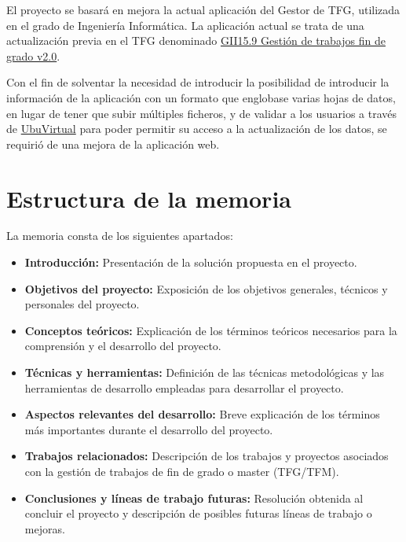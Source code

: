 El proyecto se basará en mejora la actual aplicación del Gestor de TFG, utilizada en el grado de Ingeniería Informática. La aplicación actual se trata de una actualización previa en el TFG denominado \href{https://github.com/jfb0019/Gestor-TFG-2016}{GII15.9 Gestión de trabajos fin de grado v2.0}. 

Con el fin de solventar la necesidad de introducir la posibilidad de introducir la información de la aplicación con un formato que englobase varias hojas de datos, en lugar de tener que subir múltiples ficheros, y de validar a los usuarios a través de \href{https://ubuvirtual.ubu.es/}{UbuVirtual} para poder permitir su acceso a la actualización de los datos, se requirió de una mejora de la aplicación web.

\section{Estructura de la memoria}
La memoria consta de los siguientes apartados:

\begin{itemize}
	\item \textbf{Introducción:} Presentación de la solución propuesta en el proyecto. 
	\item \textbf{Objetivos del proyecto:}  Exposición de los  objetivos generales, técnicos y personales del proyecto.
	\item \textbf{Conceptos teóricos:} Explicación de los términos teóricos necesarios para la comprensión y el desarrollo del proyecto.
	\item \textbf{Técnicas y herramientas:} Definición de las técnicas metodológicas y las herramientas de desarrollo empleadas para desarrollar el proyecto.
	\item \textbf{Aspectos relevantes del desarrollo:} Breve explicación de los términos más importantes durante el desarrollo del proyecto.
	\item \textbf{Trabajos relacionados:} Descripción de los trabajos y proyectos asociados con la gestión de trabajos de fin de grado o master (TFG/TFM).
	\item \textbf{Conclusiones y líneas de trabajo futuras:} Resolución obtenida al concluir el proyecto y descripción de posibles futuras líneas de trabajo o mejoras.
\end{itemize}